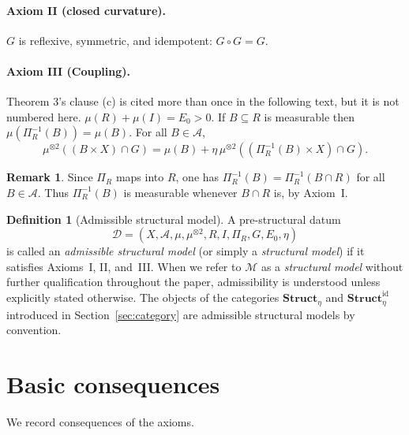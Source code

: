 \documentclass[11pt]{article}
\numberwithin{equation}{section}
\theoremstyle{definition}
\newtheorem{definition}[theorem]{Definition}
\newtheorem{remark}[theorem]{Remark}
\begin{document}
\paragraph{Axiom II (closed curvature).}
$G$ is reflexive, symmetric, and idempotent: $G\circ G=G$.

\paragraph{Axiom III (Coupling).}
\begin{structuralreview}[2]{Theorem 3's clause (c) is cited more than once in the following text, but it is not numbered here.}
$\mu(R)+\mu(I)=E_0>0$.
If $B\subseteq R$ is measurable then $\mu(\Pi_R^{-1}(B))=\mu(B)$.
For all $B\in\mathcal A$,
\[
\mu^{\otimes2}((B\times X)\cap G)
= \mu(B)+\eta\,\mu^{\otimes2}((\Pi_R^{-1}(B)\times X)\cap G).
\]
\end{structuralreview}
\begin{remark}\label{rem:preimage}
Since $\Pi_R$ maps into $R$, one has $\Pi_R^{-1}(B)=\Pi_R^{-1}(B\cap R)$ for all $B\in\mathcal A$.
Thus $\Pi_R^{-1}(B)$ is measurable whenever $B\cap R$ is, by Axiom~I.
\end{remark}

\begin{definition}[Admissible structural model]\label{def:admissible}
A pre-structural datum
\[
\mathcal D=(X,\mathcal A,\mu,\mu^{\otimes2},R,I,\Pi_R,G,E_0,\eta)
\]
is called an \emph{admissible structural model} (or simply a \emph{structural model}) if it satisfies Axioms~I, II, and~III. When we refer to $\mathcal M$ as a \emph{structural model} without further qualification throughout the paper, admissibility is understood unless explicitly stated otherwise. The objects of the categories $\mathbf{Struct}_\eta$ and $\mathbf{Struct}^{\mathrm{id}}_\eta$ introduced in Section~\ref{sec:category} are admissible structural models by convention.
\end{definition}


\section{Basic consequences}

We record consequences of the axioms.
\end{document}
